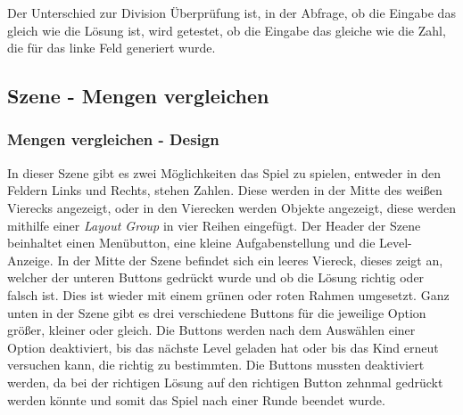 Der Unterschied zur Division Überprüfung ist, in der Abfrage, ob die Eingabe das gleich wie die Lösung ist, wird getestet, ob die Eingabe das gleiche wie die Zahl, die für das linke Feld generiert wurde.
\subsection{Szene - Mengen vergleichen}
\subsubsection{Mengen vergleichen - Design}
In dieser Szene gibt es zwei Möglichkeiten das Spiel zu spielen, entweder in den Feldern Links und Rechts, stehen Zahlen. Diese werden in der Mitte des weißen Vierecks angezeigt, oder in den Vierecken werden Objekte angezeigt, diese werden mithilfe einer \textit{Layout Group} in vier Reihen eingefügt. Der Header der Szene beinhaltet einen Menübutton, eine kleine Aufgabenstellung und die Level-Anzeige. In der Mitte der Szene befindet sich ein leeres Viereck, dieses zeigt an, welcher der unteren Buttons gedrückt wurde und ob die Lösung richtig oder falsch ist. Dies ist wieder mit einem grünen oder roten Rahmen umgesetzt. Ganz unten in der Szene gibt es drei verschiedene Buttons für die jeweilige Option größer, kleiner oder gleich. Die Buttons werden nach dem Auswählen einer Option deaktiviert, bis das nächste Level geladen hat oder bis das Kind erneut versuchen kann, die richtig zu bestimmten. Die Buttons mussten deaktiviert werden, da bei der richtigen Lösung auf den richtigen Button zehnmal gedrückt werden könnte und somit das Spiel nach einer Runde beendet wurde.\\
